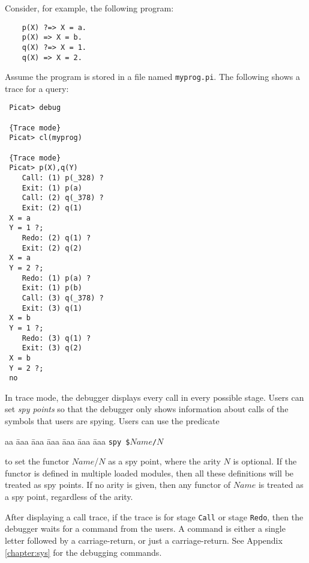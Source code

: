 Consider, for example, the following program:
\begin{verbatim}
    p(X) ?=> X = a.
    p(X) => X = b.
    q(X) ?=> X = 1.
    q(X) => X = 2.
\end{verbatim}
Assume the program is stored in a file named \texttt{myprog.pi}. The following shows a trace for a query:
\begin{verbatim}
 Picat> debug

 {Trace mode}
 Picat> cl(myprog)

 {Trace mode}
 Picat> p(X),q(Y)  
    Call: (1) p(_328) ?
    Exit: (1) p(a) 
    Call: (2) q(_378) ?
    Exit: (2) q(1) 
 X = a
 Y = 1 ?;
    Redo: (2) q(1) ?
    Exit: (2) q(2) 
 X = a
 Y = 2 ?;
    Redo: (1) p(a) ?
    Exit: (1) p(b) 
    Call: (3) q(_378) ?
    Exit: (3) q(1) 
 X = b
 Y = 1 ?;
    Redo: (3) q(1) ?
    Exit: (3) q(2) 
 X = b
 Y = 2 ?;
 no
\end{verbatim}

In trace mode, the debugger displays every call in every possible stage. Users can set \emph{spy points} so that the debugger only shows information about calls of the symbols that users are spying. Users can use the predicate 
\begin{tabbing}
aa \= aaa \= aaa \= aaa \= aaa \= aaa \= aaa \kill
\> \texttt{spy \$$Name$/$N$} 
\end{tabbing}
to set the functor $Name$/$N$ as a spy point, where the arity $N$ is optional. If the functor is defined in multiple loaded modules, then all these definitions will be treated as spy points. If no arity is given, then any functor of $Name$ is treated as a spy point, regardless of the arity.

After displaying a call trace, if the trace is for stage \texttt{Call} or stage \texttt{Redo}, then the debugger waits for a command from the users. A command is either a single letter followed by a carriage-return, or just a carriage-return. See Appendix \ref{chapter:sys} for the debugging commands.


